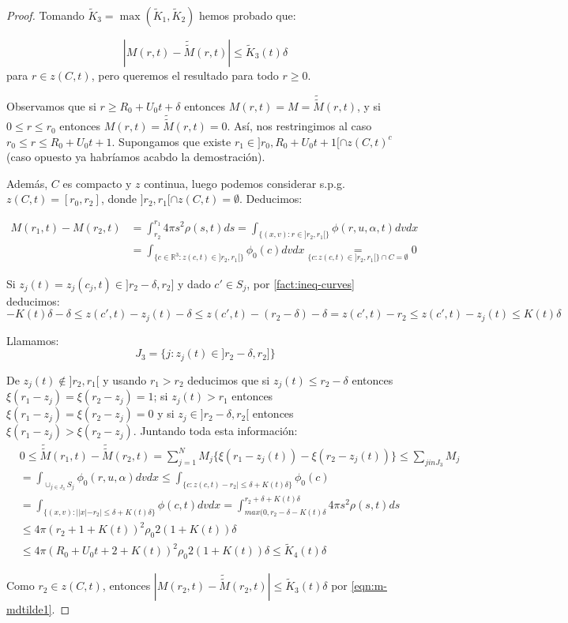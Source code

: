 \documentclass[a4paper,10pt]{scrartcl}
\theoremstyle{definition}
\newcommand{\ktilde}{\widetilde{K}}
\newcommand{\dtilde}[1]{\widetilde{\widetilde{#1}}}
\numberwithin{equation}{section}
\begin{document}
\begin{proof}
 Tomando $\ktilde_3 = \max(\ktilde_1, \ktilde_2)$ hemos probado que:
 
 \begin{equation}
 |M(r,t) - \dtilde{M}(r,t)| \le \ktilde_3(t) \delta
 \label{eqn:m-mdtilde1}
 \end{equation}
 para $r \in z(C,t)$, pero queremos el resultado para todo $r\ge 0$.
 
 Observamos que si $r \ge R_0 + U_0 t + \delta$ entonces $M(r,t) = M = \dtilde{M}(r,t)$, y si $0\le r \le r_0$ entonces $M(r,t) = \dtilde{M}(r,t) = 0$. Así, nos restringimos al caso $r_0 \le r \le R_0 + U_0t + 1$. Supongamos que existe $r_1 \in ]r_0, R_0 + U_0t + 1[ \cap z(C, t)^c$ (caso opuesto ya habríamos acabdo la demostración).
 
 Además, $C$ es compacto y $z$ continua, luego podemos considerar s.p.g. $z(C,t) = [r_0, r_2]$, donde $]r_2,r_1[ \cap z(C,t) = \emptyset$.
 Deducimos:
 
 \begin{align}
  M(r_1, t) - M(r_2, t) &= \int_{r_2}^{r_1} 4\pi s^2 \rho(s,t) ds = \int_{\{(x,v): r\in ]r_2, r_1[\}} \phi(r,u,\alpha,t) dv dx \nonumber\\
  &= \int_{\{c\in\mathbb{R}^3: z(c,t) \in ]r_2, r_1[\}} \phi_0(c) dv dx
  \underset{\{c: z(c,t) \in ]r_2,r_1[\} \cap C = \emptyset}{=} 0
  \label{eqn:mdiff}
 \end{align}
 
 Si $z_j(t) = z_j(c_j,t) \in ]r_2 - \delta, r_2]$ y dado $c'\in S_j$, por \cref{fact:ineq-curves} deducimos:
 \[
 -K(t)\delta -\delta \le z(c',t) - z_j(t) - \delta \le z(c',t) - (r_2 - \delta) - \delta = z(c',t) - r_2 \le z(c',t) - z_j(t) \le K(t)\delta
 \]
 
 Llamamos:
 \[
 J_3 = \{j: z_j(t) \in ]r_2 - \delta, r_2]\}
 \]
 
 De $z_j(t) \notin ]r_2,r_1[$ y usando $r_1 > r_2$ deducimos que si $z_j(t) \le r_2 - \delta$ entonces $\xi(r_1 - z_j) = \xi(r_2 - z_j) = 1$; si $z_j(t) > r_1$ entonces $\xi(r_1 - z_j) = \xi(r_2 - z_j) = 0$ y si $z_j \in ]r_2 - \delta, r_2[$ entonces $\xi(r_1 - z_j) > \xi(r_2 - z_j)$. Juntando toda esta información:
 \begin{align}
 &0 \le \dtilde{M}(r_1,t) - \dtilde{M}(r_2,t) = \sum_{j=1}^N M_j \bigg\{\xi(r_1 - z_j(t)) - \xi(r_2 - z_j(t))\bigg\} \le \sum_{j in J_3} M_j \nonumber\\ 
 &=\int_{\cup_{j\in J_3} S_j} \phi_0(r,u,\alpha) dv dx \le \int_{\{c : z(c,t) - r_2| \le \delta + K(t) \delta\}} \phi_0(c)\\
 &= \int_{\{(x,v): ||x| - r_2| \le \delta + K(t) \delta\}} \phi(c,t) dv dx = \int_{max(0, r_2 - \delta - K(t)\delta}^{r_2 + \delta + K(t) \delta} 4\pi s^2 \rho(s,t) ds \nonumber\\
 &\le 4\pi (r_2 + 1 + K(t))^2 \rho_0 2(1+ K(t))\delta \nonumber\\
 &\le 4\pi (R_0 + U_0t + 2 + K(t))^2 \rho_0 2 (1 + K(t))\delta \le \ktilde_4(t)\delta
 \label{eqn:mtildediff}
 \end{align}

 Como $r_2 \in z(C,t)$, entonces $|M(r_2,t) - \dtilde{M}(r_2,t)| \le \ktilde_3(t) \delta$ por \eqref{eqn:m-mdtilde1}.
 \end{proof}
 
\end{document}
